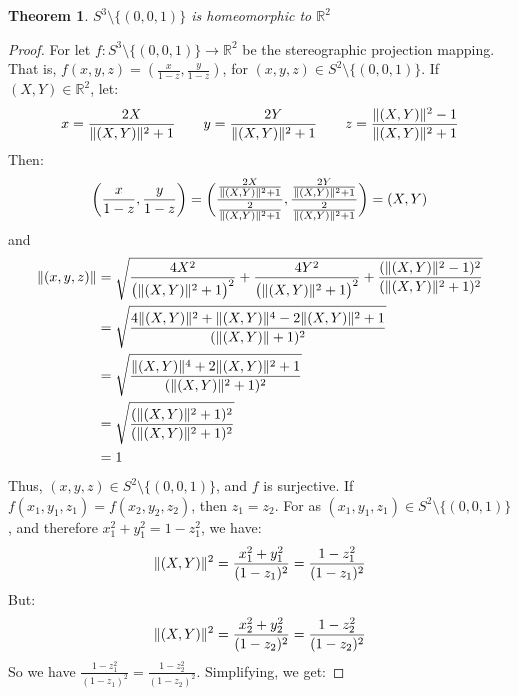 \documentclass[oneside]{book}
\theoremstyle{mystyle}
\newtheorem{theorem}{Theorem}[section]
\DeclarePairedDelimiter\norm{\lVert}{\rVert}
\begin{document}
\begin{theorem}
\label{theorem:surgery_theory_the_sphere_with_a_point_removed_is_homeomorphic_to_the_plane}
$S^{3}\setminus \{(0,0,1)\}$ is homeomorphic to $\mathbb{R}^{2}$
\end{theorem}
\begin{proof}
For let $f:S^{3}\setminus \{(0,0,1)\}\rightarrow \mathbb{R}^{2}$ be the stereographic projection mapping. That is, $f(x,y,z) = (\frac{x}{1-z},\frac{y}{1-z})$, for $(x,y,z)\in S^{2}\setminus \{(0,0,1)\}$. If $(X,Y) \in \mathbb{R}^{2}$, let:
\begin{equation*}
     x = \frac{2X}{\norm{(X,Y)}^{2}+1} \quad\quad y = \frac{2Y}{\norm{(X,Y)}^{2}+1}   \quad\quad z = \frac{\norm{(X,Y)}^{2}-1}{\norm{(X,Y)}^{2}+1} 
\end{equation*}
Then:
\begin{equation*}
    \bigg(\frac{x}{1-z},\frac{y}{1-z}\bigg) = \bigg(\frac{\frac{2X}{\norm{(X,Y)}^{2} + 1}}{\frac{2}{\norm{(X,Y)}^{2}+1}},\frac{\frac{2Y}{\norm{(X,Y)}^{2}+1}}{\frac{2}{\norm{(X,Y)}^{2}+1}}\bigg) = (X,Y)    
\end{equation*}
and
\begin{align*}
    \norm{(x,y,z)} &= \sqrt{\frac{4X^{2}}{\big(\norm{(X,Y)}^{2}+1\big)^{2}} + \frac{4Y^{2}}{\big(\norm{(X,Y)}^{2}+1\big)^{2}} + \frac{(\norm{(X,Y)}^{2}-1)^{2}}{(\norm{(X,Y)}^{2}+1)^{2}}}\\
    &= \sqrt{\frac{4\norm{(X,Y)}^{2} + \norm{(X,Y)}^{4} - 2\norm{(X,Y)}^{2} + 1}{(\norm{(X,Y)}+1)^{2}}}\\
    &= \sqrt{\frac{\norm{(X,Y)}^{4} + 2\norm{(X,Y)}^{2} + 1}{(\norm{(X,Y)}^{2}+1)^{2}}}\\
    &= \sqrt{\frac{(\norm{(X,Y)}^{2}+1)^{2}}{(\norm{(X,Y)}^{2}+1)^{2}}}\\
    &= 1
\end{align*}
Thus, $(x,y,z) \in S^{2}\setminus \{(0,0,1)\}$, and $f$ is surjective. If $f(x_1,y_1,z_1) = f(x_2,y_2,z_2)$, then $z_{1} = z_{2}$. For as $(x_1,y_1,z_1)\in S^{2}\setminus\{(0,0,1)\}$, and therefore $x_{1}^{2} + y_{1}^{2} = 1-z_{1}^{2}$, we have:
\begin{equation*}
    \norm{(X,Y)}^{2} = \frac{x_{1}^2+y_{1}^2}{(1-z_{1})^{2}} = \frac{1-z_{1}^{2}}{(1-z_{1})^{2}}
\end{equation*}
%
But:
%
\begin{equation*}
    \norm{(X,Y)}^{2} = \frac{x_{2}^{2}+y_{2}^{2}}{(1-z_{2})^{2}} = \frac{1-z_{2}^{2}}{(1-z_{2})^{2}}   
\end{equation*}
%
So we have $\frac{1-z_{1}^{2}}{(1-z_{1})^{2}} = \frac{1-z_{2}^{2}}{(1-z_{2})^{2}}$. Simplifying, we get:

\end{proof}
\end{document}
